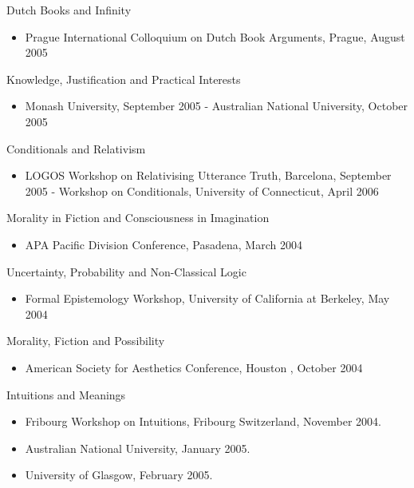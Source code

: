 \documentclass[
  10pt,
  letterpaper,
  DIV=11,
  numbers=noendperiod,
  twoside]{scrartcl}
\providecommand{\tightlist}{%
  \setlength{\itemsep}{0pt}\setlength{\parskip}{0pt}}\usepackage{longtable,booktabs,array}
\begin{document}
Dutch Books and Infinity

\begin{itemize}
\tightlist
\item
  Prague International Colloquium on Dutch Book Arguments, Prague,
  August 2005
\end{itemize}

Knowledge, Justification and Practical Interests

\begin{itemize}
\tightlist
\item
  Monash University, September 2005 - Australian National University,
  October 2005
\end{itemize}

Conditionals and Relativism

\begin{itemize}
\tightlist
\item
  LOGOS Workshop on Relativising Utterance Truth, Barcelona, September
  2005 - Workshop on Conditionals, University of Connecticut, April 2006
\end{itemize}

Morality in Fiction and Consciousness in Imagination

\begin{itemize}
\tightlist
\item
  APA Pacific Division Conference, Pasadena, March 2004
\end{itemize}

Uncertainty, Probability and Non-Classical Logic

\begin{itemize}
\tightlist
\item
  Formal Epistemology Workshop, University of California at Berkeley,
  May 2004
\end{itemize}

Morality, Fiction and Possibility

\begin{itemize}
\tightlist
\item
  American Society for Aesthetics Conference, Houston , October 2004
\end{itemize}

Intuitions and Meanings

\begin{itemize}
\tightlist
\item
  Fribourg Workshop on Intuitions, Fribourg Switzerland, November 2004.
\item
  Australian National University, January 2005.
\item
  University of Glasgow, February 2005.
\end{itemize}
\end{document}
